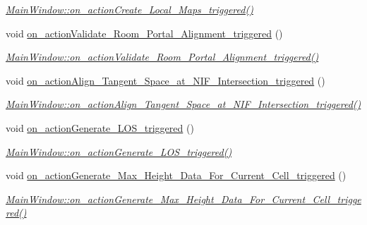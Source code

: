 \begin{DoxyCompactItemize}
\begin{DoxyCompactList}\small\item\em \hyperlink{class_main_window_a8ef4f1be069a5526d6d5f1aced12b5c3}{Main\+Window\+::on\+\_\+action\+Create\+\_\+\+Local\+\_\+\+Maps\+\_\+triggered()} \end{DoxyCompactList}\item 
void \hyperlink{class_main_window_a8d9f011472c3ef05a97ee728f1ed8134}{on\+\_\+action\+Validate\+\_\+\+Room\+\_\+\+Portal\+\_\+\+Alignment\+\_\+triggered} ()
\begin{DoxyCompactList}\small\item\em \hyperlink{class_main_window_a8d9f011472c3ef05a97ee728f1ed8134}{Main\+Window\+::on\+\_\+action\+Validate\+\_\+\+Room\+\_\+\+Portal\+\_\+\+Alignment\+\_\+triggered()} \end{DoxyCompactList}\item 
void \hyperlink{class_main_window_a86bd042548f5e84c516b90d6d8b497ef}{on\+\_\+action\+Align\+\_\+\+Tangent\+\_\+\+Space\+\_\+at\+\_\+\+N\+I\+F\+\_\+\+Intersection\+\_\+triggered} ()
\begin{DoxyCompactList}\small\item\em \hyperlink{class_main_window_a86bd042548f5e84c516b90d6d8b497ef}{Main\+Window\+::on\+\_\+action\+Align\+\_\+\+Tangent\+\_\+\+Space\+\_\+at\+\_\+\+N\+I\+F\+\_\+\+Intersection\+\_\+triggered()} \end{DoxyCompactList}\item 
void \hyperlink{class_main_window_a3710309f29e6b68d71991f67bb29b069}{on\+\_\+action\+Generate\+\_\+\+L\+O\+S\+\_\+triggered} ()
\begin{DoxyCompactList}\small\item\em \hyperlink{class_main_window_a3710309f29e6b68d71991f67bb29b069}{Main\+Window\+::on\+\_\+action\+Generate\+\_\+\+L\+O\+S\+\_\+triggered()} \end{DoxyCompactList}\item 
void \hyperlink{class_main_window_abdad9bfc636dbe25f777c4c822ef9c37}{on\+\_\+action\+Generate\+\_\+\+Max\+\_\+\+Height\+\_\+\+Data\+\_\+\+For\+\_\+\+Current\+\_\+\+Cell\+\_\+triggered} ()
\begin{DoxyCompactList}\small\item\em \hyperlink{class_main_window_abdad9bfc636dbe25f777c4c822ef9c37}{Main\+Window\+::on\+\_\+action\+Generate\+\_\+\+Max\+\_\+\+Height\+\_\+\+Data\+\_\+\+For\+\_\+\+Current\+\_\+\+Cell\+\_\+triggered()} \end{DoxyCompactList}\item 

\end{DoxyCompactItemize}
